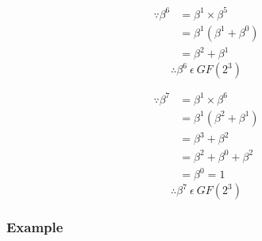         \begin{minipage}[t]{0.5\textwidth}
            \begin{equation*}
                \begin{split}
                    \because \beta^{6} & = \beta^{1} \times \beta^{5} \\
                    & = \beta^{1} (\beta^{1}+\beta^{0}) \\
                    & = \beta^{2}+\beta^{1}
                \end{split}
            \end{equation*}
            \[ \therefore \beta^{6} \ \epsilon \ GF(2^{3}) \]
        \end{minipage}
        \begin{minipage}[t]{0.5\textwidth}
            \begin{equation*}
                \begin{split}
                    \because \beta^{7} & = \beta^{1} \times \beta^{6} \\
                    & = \beta^{1} (\beta^{2}+\beta^{1}) \\
                    & = \beta^{3}+\beta^{2} \\
                    & = \beta^{2}+\beta^{0}+\beta^{2} \\
                    & = \beta^{0} = 1
                \end{split}
            \end{equation*}
            \[ \therefore \beta^{7} \ \epsilon \ GF(2^{3}) \]
        \end{minipage}

        \subsubsection{Example}

